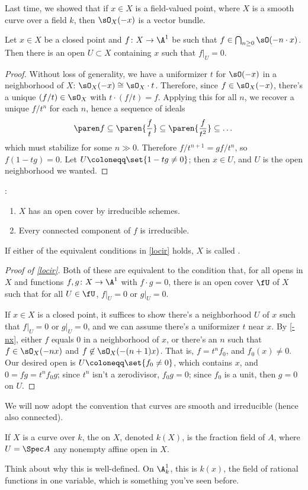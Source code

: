 Last time, we showed that if $x\in X$ is a field-valued point, where $X$ is a smooth curve over a field $k$, then
$\sO_X(-x)$ is a vector bundle.
\begin{lem}
\label{-nx}
Let $x\in X$ be a closed point and $f\colon X\to\A^1$ be such that $f\in\bigcap_{n\ge 0} \sO(-n\cdot x)$. Then
there is an open $U\subset X$ containing $x$ such that $f|_U = 0$.
\end{lem}
\begin{proof}
Without loss of generality, we have a uniformizer $t$ for $\sO(-x)$ in a neighborhood of $X$: $\sO_X(-x)
\cong\sO_X\cdot t$. Therefore, since $f\in\sO_X(-x)$, there's a unique $(f/t)\in\sO_X$ with $t\cdot (f/t) = f$.
Applying this for all $n$, we recover a unique $f/t^n$ for each $n$, hence a sequence of ideals
\begin{equation}
	\paren f\subseteq\paren{\frac ft}\subseteq\paren{\frac{f}{t^2}}\subseteq\dots
\end{equation}
which must stabilize for some $n\gg 0$. Therefore $f/t^{n+1} = gf/t^n$, so $f(1-tg) = 0$. Let $U\coloneqq\set{1-tg
\ne 0}$; then $x\in U$, and $U$ is the open neighborhood we wanted.
\end{proof}
\begin{cor}
\label{locir}
\TFAE:
\begin{enumerate}
	\item $X$ has an open cover by irreducible schemes.
	\item Every connected component of $f$ is irreducible.
\end{enumerate}
\end{cor}
\begin{defn}
If either of the equivalent conditions in \cref{locir} holds, $X$ is called .
\end{defn}
\begin{proof}[Proof of \cref{locir}]
Both of these are equivalent to the condition that, for all opens in $X$ and functions $f,g\colon X\to\A^1$ with
$f\cdot g = 0$, there is an open cover $\fU$ of $X$ such that for all $U\in\fU$, $f|_U = 0$ or $g|_U = 0$.

If $x\in X$ is a closed point, it suffices to show there's a neighborhood $U$ of $x$ such that $f|_U = 0$ or $g|_U
= 0$, and we can assume there's a uniformizer $t$ near $x$. By \cref{-nx}, either $f$ equals $0$ in a neighborhood
of $x$, or there's an $n$ such that $f\in\sO_X(-nx)$ and $f\not\in\sO_X(-(n+1)x)$. That is, $f = t^nf_0$, and
$f_0(x)\ne 0$. Our desired open is $U\coloneqq\set{f_0\ne 0}$, which contains $x$, and $0 = fg = t^nf_0g$; since
$t^n$ isn't a zerodivisor, $f_0g = 0$; since $f_0$ is a unit, then $g = 0$ on $U$.
\end{proof}
We will now adopt the convention that curves are smooth and irreducible (hence also connected).
\begin{defn}
If $X$ is a curve over $k$, the  on $X$, denoted $k(X)$, is the fraction field of
$A$, where $U = \Spec A$ any nonempty affine open in $X$.
\end{defn}
Think about why this is well-defined. On $\A_k^1$, this is $k(x)$, the field of rational functions in one variable,
which is something you've seen before.

